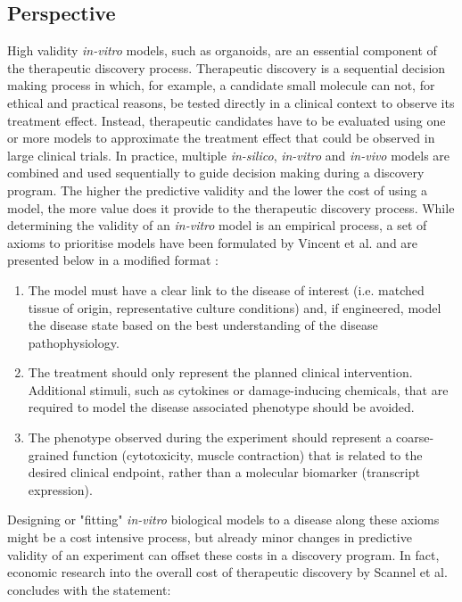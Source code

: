\begin{flushleft}
\newpage
\clearpage
\section{Perspective}

High validity \textit{in-vitro} models, such as organoids, are an essential component of the therapeutic discovery process. Therapeutic discovery is a sequential decision making process in which, for example, a candidate small molecule can not, for ethical and practical reasons, be tested directly in a clinical context to observe its treatment effect. Instead, therapeutic candidates have to be evaluated using one or more models to approximate the treatment effect that could be observed in large clinical trials. In practice, multiple \textit{in-silico}, \textit{in-vitro} and \textit{in-vivo} models are combined and used sequentially to guide decision making during a discovery program. The higher the predictive validity and the lower the cost of using a model, the more value does it provide to the therapeutic discovery process. While determining the validity of an \textit{in-vitro} model is an empirical process, a set of axioms to prioritise models have been formulated by Vincent et al. and are presented below in a modified format \parencite{vincentDevelopingPredictiveAssays2015}: 

\begin{enumerate}
    \item The model must have a clear link to the disease of interest (i.e. matched tissue of origin, representative culture conditions) and, if engineered, model the disease state based on the best understanding of the disease pathophysiology.
    \item The treatment should only represent the planned clinical intervention. Additional stimuli, such as cytokines or damage-inducing chemicals, that are required to model the disease associated phenotype should be avoided.
    \item The phenotype observed during the experiment should represent a coarse-grained function (cytotoxicity, muscle contraction) that is related to the desired clinical endpoint, rather than a molecular biomarker (transcript expression).
\end{enumerate}

Designing or "fitting" \textit{in-vitro} biological models to a disease along these axioms might be a cost intensive process, but already minor changes in predictive validity of an experiment can offset these costs in a discovery program. In fact, economic research into the overall cost of therapeutic discovery by Scannel et al. \parencite{scannellWhenQualityBeats2016} concludes with the statement:


\end{flushleft}
